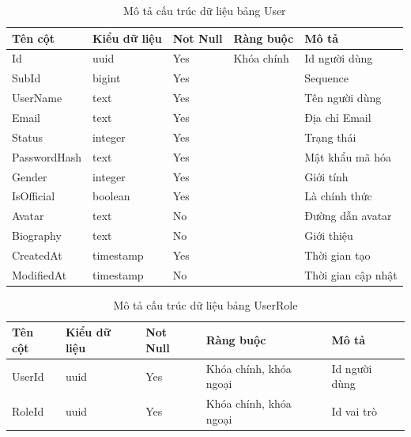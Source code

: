 \documentclass[../index.tex]{subfiles}
\begin{document}
    \begin{table}[H]
        \begin{tabular}{ |p{3cm}|p{2.5cm}|p{1.6cm}|p{2.2cm}|p{3cm}| }
            \hline
            Tên cột      & Kiểu dữ liệu             & Not Null & Ràng buộc  & Mô tả              \\
            \hline
            Id           & uuid                     & Yes      & Khóa chính & Id người dùng      \\
            \hline
            SubId        & bigint                   & Yes      &            & Sequence           \\
            \hline
            UserName     & text    & Yes      &            & Tên người dùng     \\
            \hline
            Email        & text    & Yes      &            & Địa chỉ Email      \\
            \hline
            Status       & integer                  & Yes      &            & Trạng thái         \\
            \hline
            PasswordHash & text   & Yes      &            & Mật khẩu mã hóa    \\
            \hline
            Gender       & integer                  & Yes      &            & Giới tính          \\
            \hline
            IsOfficial   & boolean                  & Yes      &            & Là chính thức      \\
            \hline
            Avatar       & text   & No       &            & Đường dẫn avatar   \\
            \hline
            Biography    & text   & No       &            & Giới thiệu         \\
            \hline
            CreatedAt    & timestamp & Yes      &            & Thời gian tạo      \\
            \hline
            ModifiedAt   & timestamp & No       &            & Thời gian cập nhật \\
            \hline
        \end{tabular}
        \caption{Mô tả cấu trúc dữ liệu bảng User}
    \end{table}

    \begin{table}[H]
        \begin{tabular}{ |p{3cm}|p{2.5cm}|p{1.6cm}|p{2.2cm}|p{3cm}| }
            \hline
            Tên cột & Kiểu dữ liệu & Not Null & Ràng buộc              & Mô tả         \\
            \hline
            UserId  & uuid         & Yes      & Khóa chính, khóa ngoại & Id người dùng \\
            \hline
            RoleId  & uuid         & Yes      & Khóa chính, khóa ngoại & Id vai trò    \\
            \hline
        \end{tabular}
        \caption{Mô tả cấu trúc dữ liệu bảng UserRole}
    \end{table}
\end{document}
